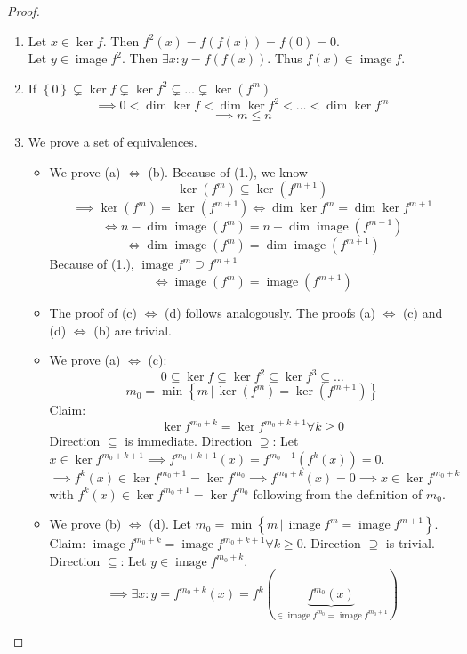 \documentclass{article}
\newcommand{\set}[1]{\left\{#1\right\}}
\newcommand{\setdef}[2]{\left\{\left.#1\,\right|\,#2\right\}}
\DeclareMathOperator{\im}{image}
\begin{document}
\begin{proof}
  \begin{enumerate} %
    \item Let $x \in \ker{f}$. Then $f^2(x) = f(f(x)) = f(0) = 0$. \\
      Let $y \in \im{f^2}$. Then $\exists x: y = f(f(x))$. Thus $f(x) \in \im{f}$.
    \item If $\set{0} \subsetneq \ker{f} \subsetneq \ker{f^2} \subsetneq \dots \subsetneq \ker(f^m)$
      \[ \implies 0 < \dim{\ker{f}} < \dim{\ker{f^2}} < \dots < \dim{\ker{f^m}} \]
      \[ \implies m \leq n \]
    \item We prove a set of equivalences.
      \begin{itemize}
        \item 
          We prove (a) $\iff$ (b).
          Because of (1.), we know
          \[ \ker(f^m) \subseteq \ker(f^{m+1}) \]
          \[ \implies \ker(f^m) = \ker(f^{m+1}) \iff \dim\ker{f^m} = \dim\ker{f^{m+1}} \]
          \[ \iff n - \dim\im(f^m) = n - \dim\im(f^{m+1}) \]
          \[ \iff \dim\im(f^m) = \dim\im(f^{m+1}) \]
          Because of (1.), $\im{f^m} \supseteq f^{m+1}$
          \[ \iff \im(f^m) = \im(f^{m+1}) \]
        \item
          The proof of (c) $\iff$ (d) follows analogously.
          The proofs (a) $\iff$ (c) and (d) $\iff$ (b) are trivial.
        \item
          We prove (a) $\iff$ (c):
          \[ 0 \subseteq \ker{f} \subseteq \ker{f^2} \subseteq \ker{f^3} \subseteq \dots \]
          \[ m_0 = \min\setdef{m}{\ker(f^m) = \ker(f^{m+1})} \]
          Claim:
          \[ \ker{f^{m_0 + k}} = \ker{f^{m_0 + k + 1}} \forall k \geq 0 \]
          Direction $\subseteq$ is immediate.
          Direction $\supseteq$: Let $x \in \ker{f^{m_0 + k + 1}} \implies f^{m_0 + k + 1}(x) = f^{m_0 + 1}(f^k(x)) = 0$.
          \[ \implies f^k(x) \in \ker{f^{m_0 + 1}} = \ker{f^{m_0}} \implies f^{m_0 + k}(x) = 0 \implies x \in \ker{f^{m_0 + k}} \]
          with $f^k(x) \in \ker{f^{m_0 + 1}} = \ker{f^{m_0}}$ following from the definition of $m_0$.
        \item
          We prove (b) $\iff$ (d).
          Let $m_0 = \min\setdef{m}{\im{f^m} = \im{f^{m+1}}}$.
          Claim: $\im{f^{m_0 + k}} = \im{f^{m_0 + k + 1}} \forall k \geq 0$.
          Direction $\supseteq$ is trivial.
          Direction $\subseteq$:
          Let $y \in \im{f^{m_0 + k}}$.
          \[ \implies \exists x: y = f^{m_0 + k}(x) = f^k(\underbrace{f^{m_0}(x)}_{\in \im{f^{m_0} = \im{f^{m_0 + 1}}}}) \]

\end{itemize}
\end{enumerate}
\end{proof}
\end{document}
